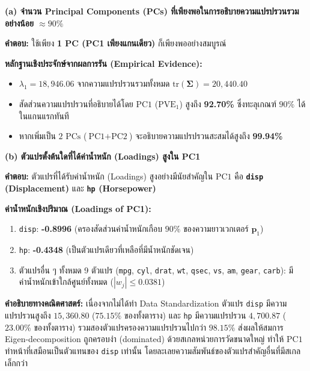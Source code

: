 \vspace{0.6em}
\begin{tcolorbox}[colback=teal!5!white,colframe=teal!60!black,title=\textbf{คำตอบข้อ 2.1 (Question 2.1) — การวิเคราะห์ PCA แบบไม่ปรับมาตรฐาน (Unstandardized PCA)},halign=left,before upper={\sloppy\raggedright},boxrule=0.6pt,arc=3pt,unbreakable]
\noindent\textbf{\normalsize (a) จำนวน Principal Components (PCs) ที่เพียงพอในการอธิบายความแปรปรวนรวมอย่างน้อย $\approx 90\%$}\par\vspace{0.2em}
\textbf{คำตอบ:} ใช้เพียง \textbf{1 PC (PC1 เพียงแกนเดียว)} ก็เพียงพออย่างสมบูรณ์\par
\textbf{หลักฐานเชิงประจักษ์จากผลการรัน (Empirical Evidence):}
\begin{itemize}[leftmargin=1.2em, itemsep=1pt]
    \item $\lambda_1 = 18,946.06$ จากความแปรปรวนรวมทั้งหมด $\text{tr}(\boldsymbol{\Sigma}) = 20,440.40$
    \item สัดส่วนความแปรปรวนที่อธิบายได้โดย $\text{PC1}$ ($\text{PVE}_1$) สูงถึง \textbf{92.70\%} ซึ่งทะลุเกณฑ์ $90\%$ ได้ในแกนแรกทันที
    \item หากเพิ่มเป็น $2\text{ PCs}$ ($\text{PC1} + \text{PC2}$) จะอธิบายความแปรปรวนสะสมได้สูงถึง \textbf{99.94\%}
\end{itemize}\vspace{0.3em}

\noindent\textbf{\normalsize (b) ตัวแปรตั้งต้นใดที่ได้ค่าน้ำหนัก (Loadings) สูงใน PC1}\par\vspace{0.2em}
\textbf{คำตอบ:} ตัวแปรที่ได้รับค่าน้ำหนัก (Loadings) สูงอย่างมีนัยสำคัญใน $\text{PC1}$ คือ \textbf{\texttt{disp} (Displacement)} และ \textbf{\texttt{hp} (Horsepower)}\par
\textbf{ค่าน้ำหนักเชิงปริมาณ (Loadings of PC1):}
\begin{enumerate}[leftmargin=1.2em, itemsep=1pt]
    \item \texttt{disp}: \textbf{-0.8996} (ครองสัดส่วนค่าน้ำหนักเกือบ $90\%$ ของความยาวเวกเตอร์ $\mathbf{p}_1$)
    \item \texttt{hp}: \textbf{-0.4348} (เป็นตัวแปรเดียวที่เหลือที่มีน้ำหนักชัดเจน)
    \item ตัวแปรอื่น ๆ ทั้งหมด 9 ตัวแปร (\texttt{mpg}, \texttt{cyl}, \texttt{drat}, \texttt{wt}, \texttt{qsec}, \texttt{vs}, \texttt{am}, \texttt{gear}, \texttt{carb}): มีค่าน้ำหนักเข้าใกล้ศูนย์ทั้งหมด ($|w_j| \le 0.0381$)
\end{enumerate}
\textbf{คำอธิบายทางคณิตศาสตร์:} เนื่องจากไม่ได้ทำ Data Standardization ตัวแปร \texttt{disp} มีความแปรปรวนสูงถึง $15,360.80$ ($75.15\%$ ของทั้งตาราง) และ \texttt{hp} มีความแปรปรวน $4,700.87$ ($23.00\%$ ของทั้งตาราง) รวมสองตัวแปรครองความแปรปรวนไปกว่า $98.15\%$ ส่งผลให้สมการ Eigen-decomposition ถูกครอบงำ (dominated) ด้วยสเกลหน่วยการวัดขนาดใหญ่ ทำให้ $\text{PC1}$ ทำหน้าที่เสมือนเป็นตัวแทนของ \texttt{disp} เท่านั้น โดยละเลยความสัมพันธ์ของตัวแปรสำคัญอื่นที่มีสเกลเล็กกว่า
\end{tcolorbox}

